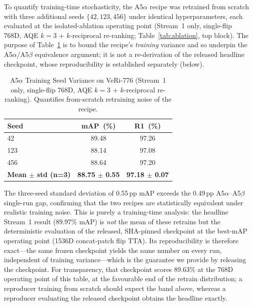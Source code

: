 \documentclass[11pt]{article}
\begin{document}
To quantify training-time stochasticity, the A5$\alpha$ recipe was retrained
from scratch with three additional seeds $\{42, 123, 456\}$ under identical
hyperparameters, each evaluated at the isolated-ablation operating point
(Stream~1 only, single-flip 768D, AQE $k{=}3$ + $k$-reciprocal re-ranking;
Table~\ref{tab:ablation}, top block). The purpose of Table~\ref{tab:seed_variance}
is to bound the recipe's \emph{training} variance and so underpin the
A5$\alpha$/A5$\beta$ equivalence argument; it is not a re-derivation of the
released headline checkpoint, whose reproducibility is established
separately (below).

\begin{table}[!t]
  \centering
  \caption{A5$\alpha$ Training Seed Variance on VeRi-776 (Stream~1 only,
    single-flip 768D, AQE $k{=}3$ + $k$-reciprocal re-ranking). Quantifies
    from-scratch retraining noise of the recipe.}
  \label{tab:seed_variance}
  \begin{tabular}{lcc}
    \toprule
    Seed & mAP~(\%) & R1~(\%) \\
    \midrule
    42  & 89.48 & 97.26 \\
    123 & 88.14 & 97.08 \\
    456 & 88.64 & 97.20 \\
    \midrule
    \textbf{Mean $\pm$ std (n=3)} & \textbf{88.75 $\pm$ 0.55} & \textbf{97.18 $\pm$ 0.07} \\
    \bottomrule
  \end{tabular}
\end{table}

The three-seed standard deviation of 0.55\,pp mAP exceeds the 0.49\,pp
A5$\alpha$--A5$\beta$ single-run gap, confirming that the two recipes are
statistically equivalent under realistic training noise. This is purely a
training-time analysis: the headline Stream~1 result (89.97\% mAP) is
\emph{not} the mean of these retrains but the deterministic evaluation of the
released, SHA-pinned checkpoint at the best-mAP operating point (1536D
concat-patch flip TTA). Its reproducibility is therefore exact---the same
frozen checkpoint yields the same number on every run, independent of
training variance---which is the guarantee we provide by releasing the
checkpoint. For transparency, that checkpoint scores 89.63\% at the 768D
operating point of this table, at the favourable end of the retrain
distribution; a reproducer training from scratch should expect the band
above, whereas a reproducer evaluating the released checkpoint obtains the
headline exactly.
\end{document}
